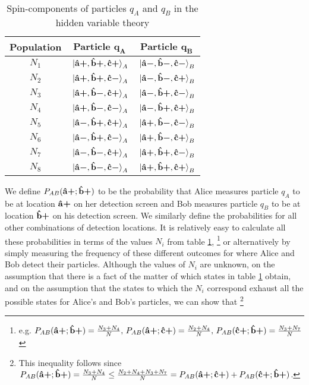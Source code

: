 \documentclass[letter, 12pt]{turabian-thesis}
\theoremstyle{hypothesis}
\newcommand{\uvb}[1]{\vb{\hat{{#1}}}}
\newcommand{\uvbp}[1]{\uvb{#1}\bm{+}}
\newcommand{\uvbm}[1]{\uvb{#1}\bm{-}}
\let\origfootnote\footnote %
\renewcommand{\footnote}[1]{%
\noindent %
\origfootnote{#1}}
\begin{document}
\begin{table}[ht]
\caption{Spin-components of particles $q_A$ and $q_B$ in the hidden variable theory}
\centering
\begin{tabular}{c c c} 
\\ 
\hline
\textbf{Population}& \textbf{Particle} $\bm{q_A}$ & \textbf{Particle} $\bm{q_B}$ \\ [0.5ex] 
\hline
$N_1$ & $\ket*{\uvbp{a},\uvbp{b},\uvbp{c}}_A$ & $\ket*{\uvbm{a},\uvbm{b},\uvbm{c}}_B$ \\ 

$N_2$ & $\ket*{\uvbp{a},\uvbp{b},\uvbm{c}}_A$ & $\ket*{\uvbm{a},\uvbm{b},\uvbp{c}}_B $\\ 

$N_3$ & $\ket*{\uvbp{a},\uvbm{b},\uvbp{c}}_A$ & $\ket*{\uvbm{a},\uvbp{b},\uvbm{c}}_B$ \\ 

$N_4$ & $\ket*{\uvbp{a},\uvbm{b},\uvbm{c}}_A$ & $\ket*{\uvbm{a},\uvbp{b},\uvbp{c}}_B $\\ 

$N_5$ & $\ket*{\uvbm{a},\uvbp{b},\uvbp{c}}_A$ & $\ket*{\uvbp{a},\uvbm{b},\uvbm{c}}_B$ \\ 

$N_6$ & $\ket*{\uvbm{a},\uvbp{b},\uvbm{c}}_A$ & $\ket*{\uvbp{a},\uvbm{b},\uvbp{c}}_B$ \\ 

$N_7$ & $\ket*{\uvbm{a},\uvbm{b},\uvbp{c}}_A$ & $\ket*{\uvbp{a},\uvbp{b},\uvbm{c} }_B$\\ 

$N_8$ & $\ket*{\uvbm{a},\uvbm{b},\uvbm{c}}_A$ & $\ket*{\uvbp{a},\uvbp{b},\uvbp{c}}_B$ \\ 
\hline
\end{tabular}
\label{hiddentable}
\end{table}
 We define $P_{AB}(\uvbp{a};\uvbp{b})$ to be the probability that Alice measures particle $q_A$ to be at location $\uvbp{a}$ on her detection screen and Bob measures particle $q_B$ to be at location $\uvbp{b}$ on his detection screen. We similarly define the probabilities for all other combinations of detection locations. It is relatively easy to calculate all these probabilities in terms of the values $N_i$ from table \ref{hiddentable},\footnote{e.g.  $P_{AB}(\uvbp{a};\uvbp{b})=\frac{N_3+N_4}{N},\, P_{AB}(\uvbp{a};\uvbp{c})=\frac{N_2+N_4}{N},\,P_{AB}(\uvbp{c};\uvbp{b})=\frac{N_3+N_7}{N}$  } or alternatively by simply measuring the frequency of these different outcomes for where Alice and Bob detect their particles. Although the values of $N_i$ are unknown, on the assumption that there is a fact of the matter of which states in table \ref{hiddentable} obtain, and on the assumption that the states to which the $N_i$ correspond exhaust all the possible states for Alice's and Bob's particles, we can show that\footnote{This inequality follows since $P_{AB}(\uvbp{a};\uvbp{b})=\frac{N_3+N_4}{N}\leq \frac{N_2+N_4+N_3+N_7}{N}=P_{AB}(\uvbp{a};\uvbp{c})+P_{AB}(\uvbp{c};\uvbp{b})$.}
\end{document}
